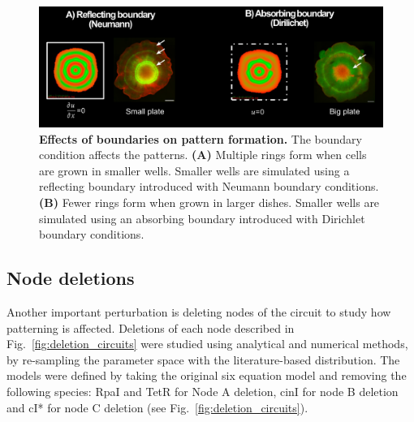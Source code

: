 \begin{figure}[H] %
    \centering
    \begin{adjustbox}{center}
        \includegraphics[width=1\textwidth]{chapters/Chapter 3/boundary_conditions_colony} %
    \end{adjustbox}
    \caption{\textbf{Effects of boundaries on pattern formation.} The boundary condition affects the patterns. \textbf{(A)} Multiple rings form when cells are grown in smaller wells. Smaller wells are simulated using a reflecting boundary introduced with Neumann boundary conditions. \textbf{(B)} Fewer rings form when grown in larger dishes. Smaller wells are simulated using an absorbing boundary introduced with Dirichlet boundary conditions.}
    \label{fig:boundary_conditions_colony}
\end{figure}

\subsection{Node deletions}
Another important perturbation is deleting nodes of the circuit to study how patterning is affected.
Deletions of each node described in Fig.~\ref{fig:deletion_circuits} were studied using analytical and numerical methods, by re-sampling the parameter space with the literature-based distribution.
The models were defined by taking the original six equation model and removing the following species: RpaI and TetR for Node A deletion, cinI for node B deletion and cI* for node C deletion (see Fig.~\ref{fig:deletion_circuits}).

